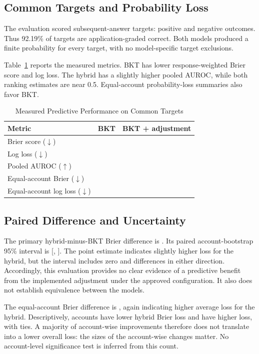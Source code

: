 \documentclass[conference]{IEEEtran}
\begin{document}
\subsection{Common Targets and Probability Loss}
The evaluation scored \ScoredTargets{} subsequent-answer targets: \ScoredPositive{} positive and \ScoredNegative{} negative outcomes. Thus 92.19\% of targets are application-graded correct. Both models produced a finite probability for every target, with no model-specific target exclusions.

Table~\ref{tab:metrics} reports the measured metrics. BKT has lower response-weighted Brier score and log loss. The hybrid has a slightly higher pooled AUROC, while both ranking estimates are near 0.5. Equal-account probability-loss summaries also favor BKT.

\begin{table}[t]
\caption{Measured Predictive Performance on Common Targets}
\label{tab:metrics}
\centering
\begin{tabular}{lrr}
\hline
Metric & BKT & BKT + adjustment \\
\hline
Brier score ($\downarrow$) & \BktBrier{} & \HybridBrier{} \\
Log loss ($\downarrow$) & \BktLogLoss{} & \HybridLogLoss{} \\
Pooled AUROC ($\uparrow$) & \BktAUC{} & \HybridAUC{} \\
Equal-account Brier ($\downarrow$) & \BktEqualBrier{} & \HybridEqualBrier{} \\
Equal-account log loss ($\downarrow$) & \BktEqualLogLoss{} & \HybridEqualLogLoss{} \\
\hline
\end{tabular}
\end{table}

\subsection{Paired Difference and Uncertainty}
The primary hybrid-minus-BKT Brier difference is \BrierDelta{}. Its paired account-bootstrap 95\% interval is [\BrierCILower{}, \BrierCIUpper{}]. The point estimate indicates slightly higher loss for the hybrid, but the interval includes zero and differences in either direction. Accordingly, this evaluation provides no clear evidence of a predictive benefit from the implemented adjustment under the approved configuration. It also does not establish equivalence between the models.

The equal-account Brier difference is \EqualBrierDelta{}, again indicating higher average loss for the hybrid. Descriptively, \LowerHybridAccounts{} accounts have lower hybrid Brier loss and \HigherHybridAccounts{} have higher loss, with \TiedAccounts{} ties. A majority of account-wise improvements therefore does not translate into a lower overall loss: the sizes of the account-wise changes matter. No account-level significance test is inferred from this count.
\end{document}
